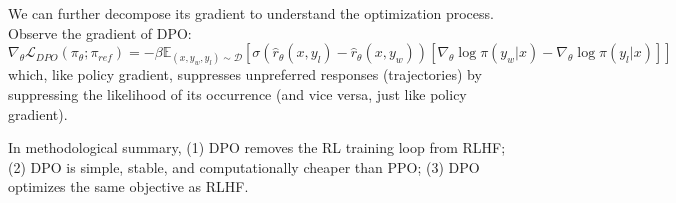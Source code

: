 We can further decompose its gradient to understand the optimization process.
Observe the gradient of DPO:
\[
    \nabla_\theta \mathcal{L}_{DPO} (\pi_\theta; \pi_{ref}) = -\beta \mathbb{E}_{(x, y_w, y_l) \sim \mathcal{D}} \left[ \sigma(\hat{r}_\theta (x, y_l) - \hat{r}_\theta (x, y_w)) \left[ \nabla_\theta \log \pi(y_w|x) - \nabla_\theta \log \pi(y_l | x) \right] \right]
\]
which, like policy gradient, suppresses unpreferred responses (trajectories) by suppressing the likelihood of its occurrence (and vice versa, just like policy gradient).

In methodological summary, (1) DPO removes the RL training loop from RLHF; (2) DPO is simple, stable, and computationally cheaper than PPO; (3) DPO optimizes the same objective as RLHF.
